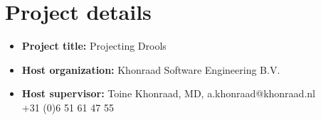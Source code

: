 \section*{Project details}

\begin{itemize}
    \item \textbf{Project title:} Projecting Drools
    \item \textbf{Host organization:} Khonraad Software Engineering B.V. 
    \item \textbf{Host supervisor:} Toine Khonraad, MD, a.khonraad@khonraad.nl\\ +31 (0)6 51 61 47 55
\end{itemize}